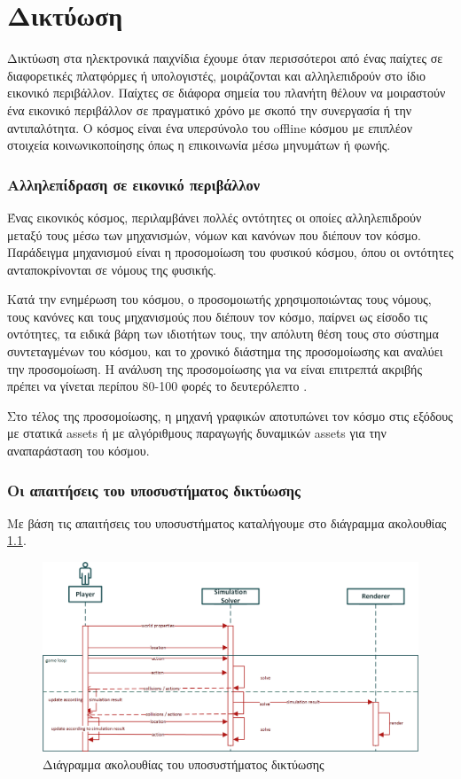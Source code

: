 	\chapter{Δικτύωση}
		Δικτύωση στα ηλεκτρονικά παιχνίδια έχουμε όταν περισσότεροι από ένας παίχτες σε διαφορετικές πλατφόρμες ή υπολογιστές, μοιράζονται και αλληλεπιδρούν στο ίδιο εικονικό περιβάλλον. Παίχτες σε διάφορα σημεία του πλανήτη θέλουν να μοιραστούν ένα εικονικό περιβάλλον σε πραγματικό χρόνο με σκοπό την συνεργασία ή την αντιπαλότητα. O κόσμος είναι ένα υπερσύνολο του offline κόσμου με επιπλέον στοιχεία κοινωνικοποίησης όπως η επικοινωνία μέσω μηνυμάτων ή φωνής.
		
		\subsection{Αλληλεπίδραση σε εικονικό περιβάλλον}	
		Ένας εικονικός κόσμος, περιλαμβάνει πολλές οντότητες οι οποίες αλληλεπιδρούν μεταξύ τους μέσω των μηχανισμών, νόμων και κανόνων που διέπουν τον κόσμο. Παράδειγμα μηχανισμού είναι η προσομοίωση του φυσικού κόσμου, όπου οι οντότητες ανταποκρίνονται σε νόμους της φυσικής.
		
	    Κατά την ενημέρωση του κόσμου, ο προσομοιωτής χρησιμοποιώντας  τους νόμους, τους κανόνες και τους μηχανισμούς που διέπουν τον κόσμο, παίρνει ως είσοδο τις οντότητες, τα ειδικά βάρη των ιδιοτήτων τους, την απόλυτη θέση τους στο σύστημα συντεταγμένων του κόσμου, και το χρονικό διάστημα της προσομοίωσης και αναλύει την προσομοίωση. Η ανάλυση της προσομοίωσης για να είναι επιτρεπτά ακριβής πρέπει να γίνεται περίπου 80-100 φορές το δευτερόλεπτο \cite{gregory2009game}.
		
		Στο τέλος της προσομοίωσης, η μηχανή γραφικών αποτυπώνει τον κόσμο στις εξόδους με στατικά assets ή με αλγόριθμους παραγωγής δυναμικών assets για την αναπαράσταση του κόσμου.
	
		\subsection{Οι απαιτήσεις του υποσυστήματος δικτύωσης}	
		Με βάση τις απαιτήσεις του υποσυστήματος καταλήγουμε στο διάγραμμα ακολουθίας \ref{fig:Network_Sequence_Diagram}.
		
		\begin{figure}[h]
			\centering
			\includegraphics[width=140mm]{Images/gameloop_network_sequence}
			\caption{Διάγραμμα ακολουθίας του υποσυστήματος δικτύωσης}
			\label{fig:Network_Sequence_Diagram}
		\end{figure}		
		

